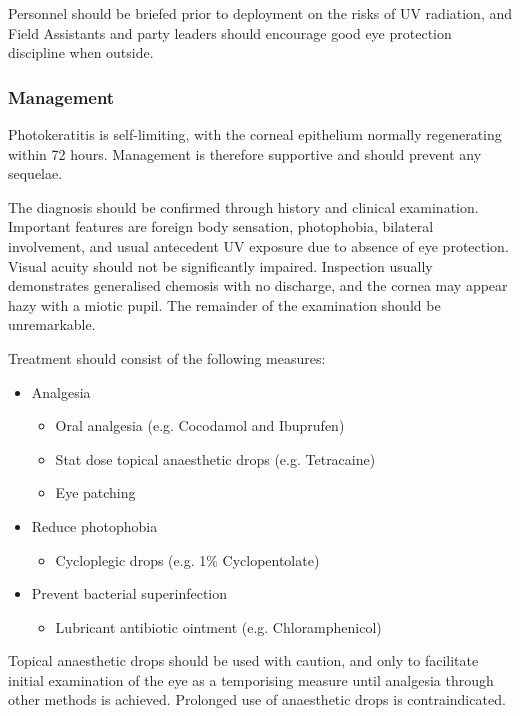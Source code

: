 \documentclass[12pt,a4paper]{article}
\begin{document}
Personnel should be briefed prior to deployment on the risks of UV radiation, and Field Assistants and party leaders should encourage good eye protection discipline when outside.

\subsubsection{Management}

Photokeratitis is self-limiting, with the corneal epithelium normally regenerating within 72 hours. Management is therefore supportive and should prevent any sequelae.

The diagnosis should be confirmed through history and clinical examination. Important features are foreign body sensation, photophobia, bilateral involvement, and usual antecedent UV exposure due to absence of eye protection. Visual acuity should not be significantly impaired. Inspection usually demonstrates generalised chemosis with no discharge, and the cornea may appear hazy with a miotic pupil. The remainder of the examination should be unremarkable.\cite{Auerbach:2012tq}

Treatment should consist of the following measures:

\begin{itemize}
    \item Analgesia
    \begin{itemize}
        \item Oral analgesia (e.g. Cocodamol and Ibuprufen)
        \item Stat dose topical anaesthetic drops (e.g. Tetracaine)
        \item Eye patching
    \end{itemize}
    \item Reduce photophobia
    \begin{itemize}
        \item Cycloplegic drops (e.g. 1\% Cyclopentolate)
    \end{itemize}
    \item Prevent bacterial superinfection
    \begin{itemize}
        \item Lubricant antibiotic ointment (e.g. Chloramphenicol)
    \end{itemize}
\end{itemize}

Topical anaesthetic drops should be used with caution, and only to facilitate initial examination of the eye as a temporising measure until analgesia through other methods is achieved. Prolonged use of anaesthetic drops is contraindicated.\cite{Patel:2013ki}
\end{document}
